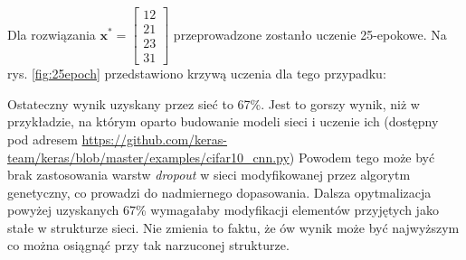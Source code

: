 Dla rozwiązania $\mathbf{x^*} = \begin{bmatrix}12 \\ 21 \\ 23 \\ 31\end{bmatrix}$ przeprowadzone zostanło uczenie 25-epokowe.
Na rys. \ref{fig:25epoch} przedstawiono krzywą uczenia dla tego przypadku:

Ostateczny wynik uzyskany przez sieć to 67\%.
Jest to gorszy wynik, niż w przykładzie, na którym oparto budowanie modeli sieci i uczenie ich (dostępny pod adresem \url{https://github.com/keras-team/keras/blob/master/examples/cifar10_cnn.py})
Powodem tego może być brak zastosowania warstw \textit{dropout} w sieci modyfikowanej przez algorytm genetyczny, co prowadzi do nadmiernego dopasowania.
Dalsza opytmalizacja powyżej uzyskanych 67\% wymagałaby modyfikacji elementów przyjętych jako stałe w strukturze sieci.
Nie zmienia to faktu, że ów wynik może być najwyższym co można osiągnąć przy tak narzuconej strukturze.
